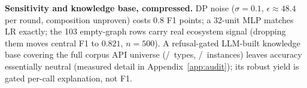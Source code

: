 \documentclass[sigconf,nonacm]{acmart}
\begin{document}
\textbf{Sensitivity and knowledge base, compressed.} DP noise
($\sigma{=}0.1$, $\epsilon\!\approx\!48.4$ per round, composition
unproven) costs $0.8$ F1 points; a 32-unit MLP matches LR exactly; the
103 empty-graph rows carry real ecosystem signal (dropping them moves
central F1 to $0.821$, $n{=}500$). A refusal-gated LLM-built knowledge
base covering the full corpus API universe
(\pmKbUniverseTypes/\pmKbUniverseTypes\ types,
\pmKbUniverseInstances/\pmKbUniverseInstances\ instances) leaves accuracy
essentially neutral (measured detail in Appendix~\ref{app:audit}); its
robust yield is gated per-call explanation, not F1.
\end{document}

